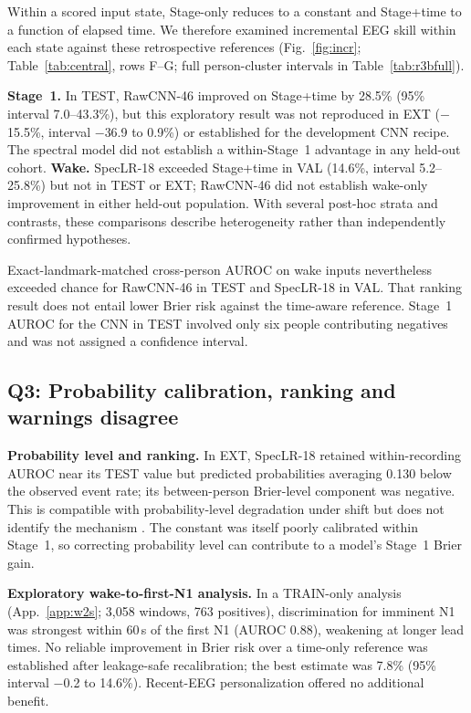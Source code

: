 \documentclass{article}
\begin{document}
Within a scored input state, Stage-only reduces to a constant and Stage+time to a function of elapsed time. We therefore examined incremental EEG skill within each state against these retrospective references (Fig.~\ref{fig:incr}; Table~\ref{tab:central}, rows F--G; full person-cluster intervals in Table~\ref{tab:r3bfull}).

\textbf{Stage~1.} In TEST, RawCNN-46 improved on Stage+time by 28.5\% (95\% interval 7.0--43.3\%), but this exploratory result was not reproduced in EXT ($-$15.5\%, interval $-$36.9 to 0.9\%) or established for the development CNN recipe. The spectral model did not establish a within-Stage~1 advantage in any held-out cohort. \textbf{Wake.} SpecLR-18 exceeded Stage+time in VAL (14.6\%, interval 5.2--25.8\%) but not in TEST or EXT; RawCNN-46 did not establish wake-only improvement in either held-out population. With several post-hoc strata and contrasts, these comparisons describe heterogeneity rather than independently confirmed hypotheses.

Exact-landmark-matched cross-person AUROC on wake inputs nevertheless exceeded chance for RawCNN-46 in TEST and SpecLR-18 in VAL. That ranking result does not entail lower Brier risk against the time-aware reference. Stage~1 AUROC for the CNN in TEST involved only six people contributing negatives and was not assigned a confidence interval.

\subsection{Q3: Probability calibration, ranking and warnings disagree}
\label{sec:resE}

\textbf{Probability level and ranking.} In EXT, SpecLR-18 retained within-recording AUROC near its TEST value but predicted probabilities averaging 0.130 below the observed event rate; its between-person Brier-level component was negative. This is compatible with probability-level degradation under shift but does not identify the mechanism \citep{ovadia2019trust}. The constant was itself poorly calibrated within Stage~1, so correcting probability level can contribute to a model's Stage~1 Brier gain.

\textbf{Exploratory wake-to-first-N1 analysis.} In a TRAIN-only analysis (App.~\ref{app:w2s}; 3{,}058 windows, 763 positives), discrimination for imminent N1 was strongest within 60\,s of the first N1 (AUROC 0.88), weakening at longer lead times. No reliable improvement in Brier risk over a time-only reference was established after leakage-safe recalibration; the best estimate was 7.8\% (95\% interval $-$0.2 to 14.6\%). Recent-EEG personalization offered no additional benefit.
\end{document}
